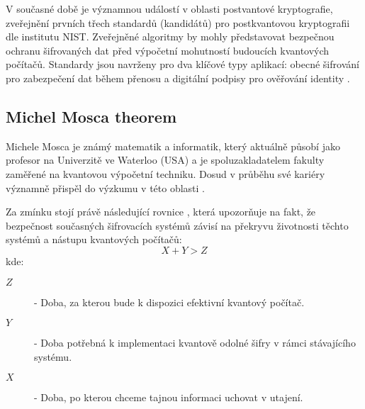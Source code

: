 V současné době je významnou událostí v oblasti postvantové kryptografie, zveřejnění prvních třech standardů (kandidátů) pro postkvantovou kryptografii dle institutu NIST. Zveřejněné algoritmy by mohly představovat bezpečnou ochranu šifrovaných dat před výpočetní mohutností budoucích kvantových počítačů. Standardy jsou navrženy pro dva klíčové typy aplikací: obecné šifrování pro zabezpečení dat během přenosu a digitální podpisy pro ověřování identity \parencite{nist2024}.

\subsection{Michel Mosca theorem}
Michele Mosca je známý matematik a informatik, který aktuálně působí jako profesor na Univerzitě ve Waterloo (USA) a je spoluzakladatelem fakulty zaměřené na kvantovou výpočetní techniku. Dosud v průběhu své kariéry významně přispěl do výzkumu v této oblasti \parencite{mosca2023}.

Za zmínku stojí právě následující rovnice \textcite{mosca2023}, která upozorňuje na fakt, že bezpečnost současných šifrovacích systémů závisí na překryvu životnosti těchto systémů a nástupu kvantových počítačů:
\begin{equation}
X + Y > Z
\end{equation}
kde:
\begin {description}
\item[$Z$] - Doba, za kterou bude k dispozici efektivní kvantový počítač.
\item[$Y$] - Doba potřebná k implementaci kvantově odolné šifry v rámci stávajícího systému.
\item[$X$] - Doba, po kterou chceme tajnou informaci uchovat v utajení.
\end {description}
\newpage